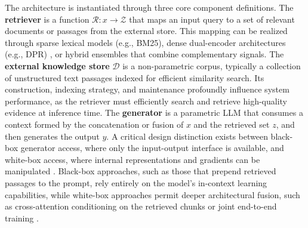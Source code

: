\documentclass[11pt,a4paper]{article}
\begin{document}
The architecture is instantiated through three core component definitions. The \textbf{retriever} is a function \( \mathcal{R}: x \to \mathcal{Z} \) that maps an input query to a set of relevant documents or passages from the external store. This mapping can be realized through sparse lexical models (e.g., BM25), dense dual-encoder architectures (e.g., DPR) \cite{arxiv:2211.14876v1}, or hybrid ensembles that combine complementary signals. The \textbf{external knowledge store} \( \mathcal{D} \) is a non-parametric corpus, typically a collection of unstructured text passages indexed for efficient similarity search. Its construction, indexing strategy, and maintenance profoundly influence system performance, as the retriever must efficiently search and retrieve high-quality evidence at inference time. The \textbf{generator} is a parametric LLM that consumes a context formed by the concatenation or fusion of \( x \) and the retrieved set \( z \), and then generates the output \( y \). A critical design distinction exists between black-box generator access, where only the input-output interface is available, and white-box access, where internal representations and gradients can be manipulated \cite{arxiv:2301.12652v4,arxiv:2310.11511v1}. Black-box approaches, such as those that prepend retrieved passages to the prompt, rely entirely on the model's in-context learning capabilities, while white-box approaches permit deeper architectural fusion, such as cross-attention conditioning on the retrieved chunks \cite{arxiv:2112.04426v3} or joint end-to-end training \cite{arxiv:2208.03299v3}.
\end{document}

